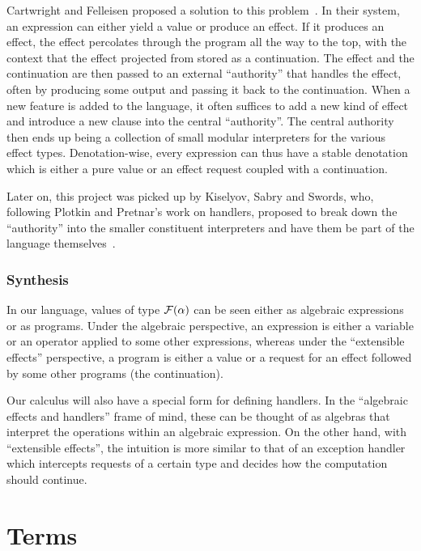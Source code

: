 Cartwright and Felleisen proposed a solution to this
problem~\cite{cartwright1994extensible}. In their system, an expression can
either yield a value or produce an effect. If it produces an effect, the
effect percolates through the program all the way to the top, with the
context that the effect projected from stored as a continuation. The effect
and the continuation are then passed to an external ``authority'' that
handles the effect, often by producing some output and passing it back to
the continuation. When a new feature is added to the language, it often
suffices to add a new kind of effect and introduce a new clause into the
central ``authority''. The central authority then ends up being a
collection of small modular interpreters for the various effect
types. Denotation-wise, every expression can thus have a stable denotation
which is either a pure value or an effect request coupled with a
continuation.

Later on, this project was picked up by Kiselyov, Sabry and Swords, who,
following Plotkin and Pretnar's work on handlers, proposed to break down
the ``authority'' into the smaller constituent interpreters and have them
be part of the language themselves~\cite{kiselyov2013extensible}.


\subsubsection*{Synthesis}

In our language, values of type $\mathcal{F}(\alpha)$ can be seen either as
algebraic expressions or as programs. Under the algebraic perspective, an
expression is either a variable or an operator applied to some other
expressions, whereas under the ``extensible effects'' perspective, a
program is either a value or a request for an effect followed by some other
programs (the continuation).

Our calculus will also have a special form for defining handlers. In the
``algebraic effects and handlers'' frame of mind, these can be thought of
as algebras that interpret the operations within an algebraic
expression. On the other hand, with ``extensible effects'', the intuition
is more similar to that of an exception handler which intercepts requests
of a certain type and decides how the computation should continue.


\section{Terms}

